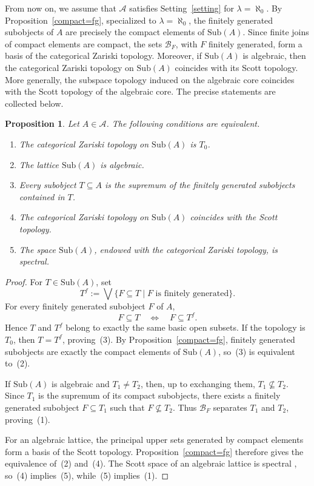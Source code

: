 \documentclass{amsproc}
\theoremstyle{definition}
\theoremstyle{plain}
\newtheorem{Prop}[theorem]{Proposition}
\theoremstyle{remark}
\numberwithin{equation}{section}
\newcommand{\Cal}[1]{{\mathcal #1}}
\newcommand{\sub}[1]{\mathrm{Sub} (#1)}
\begin{document}
From now on, we assume that $\mathscr A$ satisfies Setting~\ref{setting} for $\lambda=\aleph_0$. By Proposition~\ref{compact=fg}, specialized to $\lambda=\aleph_0$, the finitely generated subobjects of $A$ are precisely the compact elements of $\sub A$. Since finite joins of compact elements are compact, the sets $\Cal B_F$, with $F$ finitely generated, form a basis of the categorical Zariski topology. Moreover, if $\sub A$ is algebraic, then the categorical Zariski topology on $\sub A$ coincides with its Scott topology. More generally, the subspace topology induced on the algebraic core coincides with the Scott topology of the algebraic core. The precise statements are collected below.


\begin{Prop}\label{whole-subobject-space}
Let $A\in\mathscr A$. The following conditions are equivalent.
\begin{enumerate}
    \item The categorical Zariski topology on $\sub A$ is $T_0$.
    \item The lattice $\sub A$ is algebraic.
    \item Every subobject $T\subseteq A$ is the supremum of the finitely generated subobjects contained in $T$.
    \item The categorical Zariski topology on $\sub A$ coincides with the Scott topology.
    \item The space $\sub A$, endowed with the categorical Zariski topology, is spectral.
\end{enumerate}
\end{Prop}

\begin{proof}
For $T\in\sub A$, set
$$
T^f:=\bigvee\{F\subseteq T\mid F\text{ is finitely generated}\}.
$$
For every finitely generated subobject $F$ of $A$,
$$
F\subseteq T
\quad\Longleftrightarrow\quad
F\subseteq T^f.
$$
Hence $T$ and $T^f$ belong to exactly the same basic open subsets. If the topology is $T_0$, then $T=T^f$, proving~(3). By Proposition~\ref{compact=fg}, finitely generated subobjects are exactly the compact elements of $\sub A$, so~(3) is equivalent to~(2).

If $\sub A$ is algebraic and $T_1\neq T_2$, then, up to exchanging them, $T_1\nsubseteq T_2$. Since $T_1$ is the supremum of its compact subobjects, there exists a finitely generated subobject $F\subseteq T_1$ such that $F\nsubseteq T_2$. Thus $\Cal B_F$ separates $T_1$ and $T_2$, proving~(1).

For an algebraic lattice, the principal upper sets generated by compact elements form a basis of the Scott topology. Proposition~\ref{compact=fg} therefore gives the equivalence of~(2) and~(4). The Scott space of an algebraic lattice is spectral \cite[Chapter~II]{Gierz2003}, so~(4) implies~(5), while~(5) implies~(1).
\end{proof}
\end{document}
